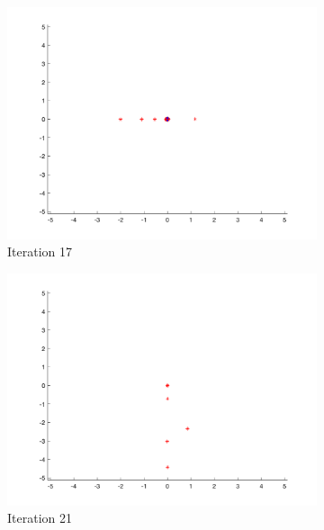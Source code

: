 \begin{figure}
\begin{subfigure}[b]{0.4\textwidth}
    \includegraphics[width=\textwidth]{img/smpl/rast2d/loa-iter-17}
    \caption{Iteration 17}
    \label{fig:s4-iter-4}
  \end{subfigure}
  \begin{subfigure}[b]{0.4\textwidth}
    \includegraphics[width=\textwidth]{img/smpl/rast2d/loa-iter-21}
    \caption{Iteration 21}
    \label{fig:s4-iter-5}
  \end{subfigure}
  \begin{subfigure}[b]{0.4\textwidth}

\end{subfigure}
\end{figure}
